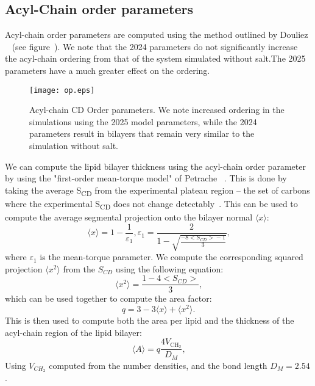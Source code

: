 \subsection{Acyl-Chain order parameters}
Acyl-chain order parameters are computed using the method outlined by Douliez \etal~\cite{Douliez:1995} (see  figure~\label{fig:acylorder}). We note that
the 2024 \mg{} parameters do not significantly increase the acyl-chain ordering from that of the system simulated without salt.The 2025 \mg{} parameters have a much greater effect on the ordering.
\begin{figure}[h!]
   \caption[Acyl-Chain order parameters]{Acyl-chain CD Order parameters. We note increased ordering in the
   simulations using the 2025 model parameters, while the 2024 parameters result in
bilayers that remain very similar to the simulation without salt.}
   \label{fig:acylorder}
   \texttt{[image: op.eps]}
\end{figure}
We can compute the lipid bilayer thickness using the acyl-chain order parameter by using the
"first-order mean-torque model" of Petrache \etal~\cite{petrache:2000:nmrarea,nagle:2000}.
This is done by taking the average S\textsubscript{CD} from the experimental plateau region -- the set of carbons where the experimental S\textsubscript{CD} does not change
detectably~\cite{nagle:2000,nagle:1993:nmrarea}. This can be used to compute the average segmental projection onto the bilayer normal $\langle x \rangle$:
\begin{equation}
   \langle x \rangle = 1 - \frac{1}{\varepsilon_1}, \varepsilon_1 = \frac{2}{1 - \sqrt{\frac{-8\big<S_{CD}\big> - 1}{3}}}\text{,}
\end{equation}
where $\varepsilon_1$ is the mean-torque parameter. We compute the corresponding squared projection $\langle x^2 \rangle$ from the $S_{CD}$
using the following equation:
\begin{equation}
   \langle x^2 \rangle = \frac{1 - 4\big<S_{CD}\big>}{3}\text{,}
\end{equation}
which can be used together to compute the area factor:
\begin{equation}
q = 3 - 3 \langle x \rangle + \langle x^2 \rangle\text{.}
\end{equation}
This is then used to compute both the area per lipid and the thickness of the acyl-chain region of the lipid bilayer:
\begin{equation}
   \langle A \rangle = q\frac{4V_{\text{CH}_2}}{D_M}\text{,}
\end{equation}
Using $V_{CH_2}$ computed from the number densities, and the bond length $D_M=2.54$.
